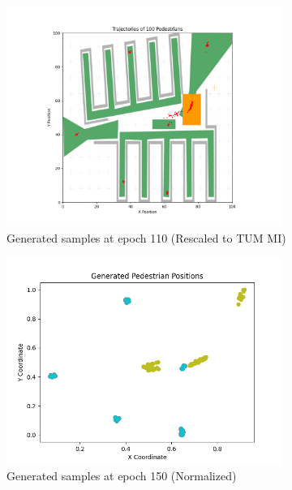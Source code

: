 \documentclass[10pt,a4paper]{article}
\begin{document}
\begin{figure}[H]
    \centering
    \includegraphics[width=0.8\textwidth]{Images/pedestrians_trajectories_epoch110.png}
    \caption{Generated samples at epoch 110 (Rescaled to TUM MI)}
    \label{fig:epoch110_real}
\end{figure}

\begin{figure}[H]
    \centering
    \includegraphics[width=0.8\textwidth]{Images/nomalized_epoch150.png}
    \caption{Generated samples at epoch 150 (Normalized)}
    \label{fig:epoch150_norm}
\end{figure}
\end{document}
